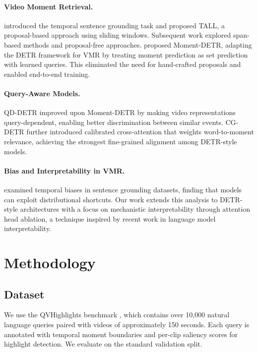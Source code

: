 \documentclass[10pt,twocolumn]{article}
\begin{document}
\paragraph{Video Moment Retrieval.}
\citet{gao2017tall} introduced the temporal sentence grounding task and proposed TALL, a proposal-based approach using sliding windows. Subsequent work explored span-based methods \citep{zhang2020span} and proposal-free approaches. \citet{lei2021qvhighlights} proposed Moment-DETR, adapting the DETR framework \citep{carion2020detr} for VMR by treating moment prediction as set prediction with learned queries. This eliminated the need for hand-crafted proposals and enabled end-to-end training.

\paragraph{Query-Aware Models.}
QD-DETR \citep{moon2023qd} improved upon Moment-DETR by making video representations query-dependent, enabling better discrimination between similar events. CG-DETR \citep{moon2023cg} further introduced calibrated cross-attention that weights word-to-moment relevance, achieving the strongest fine-grained alignment among DETR-style models.

\paragraph{Bias and Interpretability in VMR.}
\citet{li2023debiased} examined temporal biases in sentence grounding datasets, finding that models can exploit distributional shortcuts. Our work extends this analysis to DETR-style architectures with a focus on mechanistic interpretability through attention head ablation, a technique inspired by recent work in language model interpretability.

\section{Methodology}
\label{sec:method}

\subsection{Dataset}
\label{sec:dataset}

We use the QVHighlights benchmark \citep{lei2021qvhighlights}, which contains over 10,000 natural language queries paired with videos of approximately 150 seconds. Each query is annotated with temporal moment boundaries and per-clip saliency scores for highlight detection. We evaluate on the standard validation split.
\end{document}
